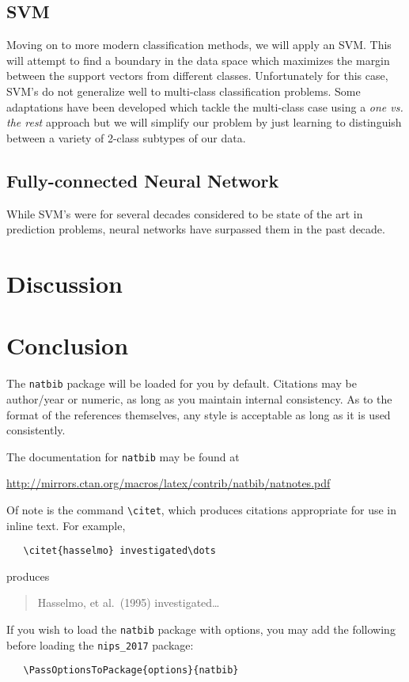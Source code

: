 \documentclass{article}
\begin{document}
\subsection{SVM}
Moving on to more modern classification methods, we will apply an SVM. This will attempt to find a boundary in the data space which maximizes the margin between the support vectors from different classes. Unfortunately for this case, SVM's do not generalize well to multi-class classification problems. Some adaptations have been developed which tackle the multi-class case using a \textit{one vs. the rest} approach but we will simplify our problem by just learning to distinguish between a variety of 2-class subtypes of our data.

\subsection{Fully-connected Neural Network}
While SVM's were for several decades considered to be state of the art in prediction problems, neural networks have surpassed them in the past decade. 

\section{Discussion}


\section{Conclusion}
The \verb+natbib+ package will be loaded for you by default.
Citations may be author/year or numeric, as long as you maintain
internal consistency.  As to the format of the references themselves,
any style is acceptable as long as it is used consistently.

The documentation for \verb+natbib+ may be found at
\begin{center}
  \url{http://mirrors.ctan.org/macros/latex/contrib/natbib/natnotes.pdf}
\end{center}
Of note is the command \verb+\citet+, which produces citations
appropriate for use in inline text.  For example,
\begin{verbatim}
   \citet{hasselmo} investigated\dots
\end{verbatim}
produces
\begin{quote}
  Hasselmo, et al.\ (1995) investigated\dots
\end{quote}

If you wish to load the \verb+natbib+ package with options, you may
add the following before loading the \verb+nips_2017+ package:
\begin{verbatim}
   \PassOptionsToPackage{options}{natbib}
\end{verbatim}
\end{document}
